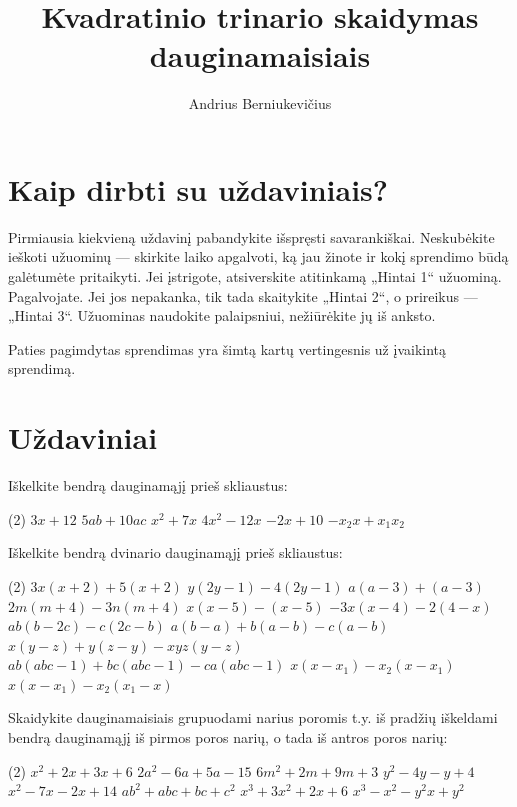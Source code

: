\documentclass[11pt,a4paper]{scrartcl}
\title{Kvadratinio trinario skaidymas dauginamaisiais}
\author{Andrius Berniukevičius}
\begin{document}
\maketitle
\section*{Kaip dirbti su uždaviniais?}

Pirmiausia kiekvieną uždavinį pabandykite išspręsti savarankiškai. Neskubėkite ieškoti užuominų — skirkite laiko apgalvoti, ką jau žinote ir kokį sprendimo būdą galėtumėte pritaikyti. Jei įstrigote, atsiverskite atitinkamą „Hintai 1“ užuominą. Pagalvojate. Jei jos nepakanka, tik tada skaitykite „Hintai 2“, o prireikus — „Hintai 3“. Užuominas naudokite palaipsniui, nežiūrėkite jų iš anksto.

Paties pagimdytas sprendimas yra šimtą kartų vertingesnis už įvaikintą sprendimą.

\section{Uždaviniai}

\begin{problem}
Iškelkite bendrą dauginamąjį prieš skliaustus:
\begin{tasks}[label={(\arabic*)}, label-offset=0.9em](2)
    \task $3x + 12$
    \task $5ab + 10ac$
    \task $x^2 + 7x$
    \task $4x^2 - 12x$
    \task $-2x + 10$
    \task $-x_2x + x_1x_2$
\end{tasks}
\end{problem}

\begin{problem}
Iškelkite bendrą dvinario dauginamąjį prieš skliaustus:
\begin{tasks}[label={(\arabic*)}, label-offset=0.9em](2)
    \task $3x(x + 2) + 5(x + 2)$
    \task $y(2y - 1) - 4(2y - 1)$
    \task $a(a - 3) + (a - 3)$
    \task $2m(m + 4) - 3n(m + 4)$
    \task $x(x - 5) - (x - 5)$
    \task $-3x(x - 4) - 2(4-x)$
    \task $ab(b-2c) - c(2c-b)$
    \task $a(b-a)+b(a-b)-c(a-b)$
    \task $x(y-z) + y(z-y)-xyz(y-z)$
    \task $ab(abc-1)+bc(abc-1)-ca(abc-1)$
    \task $x(x-x_1)-x_2(x-x_1)$  
    \task $x(x-x_1)-x_2(x_1-x)$  
\end{tasks}
\end{problem}

\begin{problem}
Skaidykite dauginamaisiais grupuodami narius poromis t.y. iš pradžių iškeldami bendrą dauginamąjį iš pirmos poros narių, o tada iš antros poros narių:
\begin{tasks}[label={(\arabic*)}, label-offset=0.9em](2)
    \task $x^2 + 2x + 3x + 6$
    \task $2a^2 - 6a + 5a - 15$
    \task $6m^2 + 2m + 9m + 3$
    \task $y^2 - 4y - y + 4$
    \task $x^2 - 7x - 2x + 14$
    \task $ab^{2}+abc+bc+ c^{2} $ 
    \task $x^3 + 3x^2 + 2x + 6$
    \task $x ^{3} -x ^{2} -y ^{2} x  +y ^{2} $ 
\end{tasks}
\end{problem}
\end{document}
